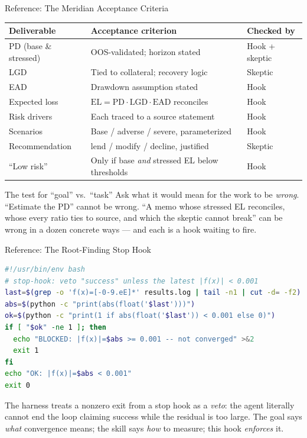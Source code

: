 \documentclass[9pt,t]{beamer}
\begin{document}
\begin{frame}[noframenumbering]{Reference: The Meridian Acceptance Criteria}

\begin{table}
\centering\small
\begin{tabular}{@{}lll@{}}
\toprule
Deliverable & Acceptance criterion & Checked by \\
\midrule
PD (base \& stressed) & OOS-validated; horizon stated & Hook + skeptic \\
LGD & Tied to collateral; recovery logic & Skeptic \\
EAD & Drawdown assumption stated & Hook \\
Expected loss & $\mathrm{EL}=\mathrm{PD}\cdot\mathrm{LGD}\cdot\mathrm{EAD}$ reconciles & Hook \\
Risk drivers & Each traced to a source statement & Hook \\
Scenarios & Base / adverse / severe, parameterized & Hook \\
Recommendation & lend / modify / decline, justified & Skeptic \\
``Low risk'' & Only if base \emph{and} stressed EL below thresholds & Hook \\
\bottomrule
\end{tabular}
\end{table}

\medskip
\begin{block}{The test for ``goal'' vs.\ ``task''}
Ask what it would mean for the work to be \emph{wrong}. ``Estimate the PD'' cannot
be wrong. ``A memo whose stressed EL reconciles, whose every ratio ties to source,
and which the skeptic cannot break'' can be wrong in a dozen concrete ways --- and
each is a hook waiting to fire.
\end{block}
\end{frame}

\begin{frame}{Reference: The Root-Finding Stop Hook}

\begin{lstlisting}[language=bash]
#!/usr/bin/env bash
# stop-hook: veto "success" unless the latest |f(x)| < 0.001
last=$(grep -o 'f(x)=[-0-9.eE]*' results.log | tail -n1 | cut -d= -f2)
abs=$(python -c "print(abs(float('$last')))")
ok=$(python -c "print(1 if abs(float('$last')) < 0.001 else 0)")
if [ "$ok" -ne 1 ]; then
  echo "BLOCKED: |f(x)|=$abs >= 0.001 -- not converged" >&2
  exit 1
fi
echo "OK: |f(x)|=$abs < 0.001"
exit 0
\end{lstlisting}

\smallskip
The harness treats a nonzero exit from a stop hook as a \emph{veto}: the agent
literally cannot end the loop claiming success while the residual is too large.
The goal says \emph{what} convergence means; the skill says \emph{how} to measure;
this hook \emph{enforces} it.
\end{frame}
\end{document}
